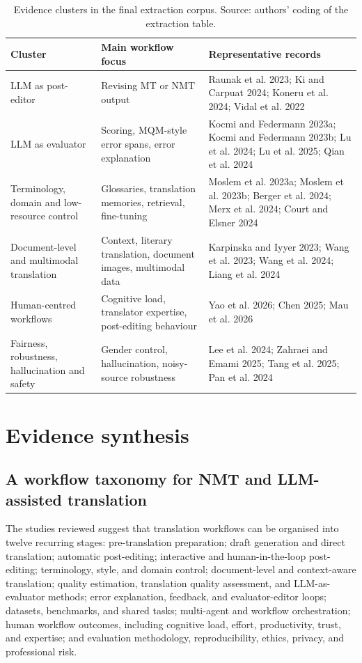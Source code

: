 \documentclass[11pt]{article}
\begin{document}
\begin{table}[t]
\centering
\caption{Evidence clusters in the final extraction corpus. Source: authors' coding of the extraction table.}
\small
\begin{tabularx}{\textwidth}{>{\RaggedRight\arraybackslash}p{2.8cm}>{\RaggedRight\arraybackslash}p{3.5cm}>{\RaggedRight\arraybackslash}X}
\toprule
Cluster & Main workflow focus & Representative records \\
\midrule
LLM as post-editor & Revising MT or NMT output & Raunak et al. 2023; Ki and Carpuat 2024; Koneru et al. 2024; Vidal et al. 2022 \\
LLM as evaluator & Scoring, MQM-style error spans, error explanation & Kocmi and Federmann 2023a; Kocmi and Federmann 2023b; Lu et al. 2024; Lu et al. 2025; Qian et al. 2024 \\
Terminology, domain and low-resource control & Glossaries, translation memories, retrieval, fine-tuning & Moslem et al. 2023a; Moslem et al. 2023b; Berger et al. 2024; Merx et al. 2024; Court and Elsner 2024 \\
Document-level and multimodal translation & Context, literary translation, document images, multimodal data & Karpinska and Iyyer 2023; Wang et al. 2023; Wang et al. 2024; Liang et al. 2024 \\
Human-centred workflows & Cognitive load, translator expertise, post-editing behaviour & Yao et al. 2026; Chen 2025; Mau et al. 2026 \\
Fairness, robustness, hallucination and safety & Gender control, hallucination, noisy-source robustness & Lee et al. 2024; Zahraei and Emami 2025; Tang et al. 2025; Pan et al. 2024 \\
\bottomrule
\end{tabularx}
\end{table}

\section{Evidence synthesis}
\subsection{A workflow taxonomy for NMT and LLM-assisted translation}
The studies reviewed suggest that translation workflows can be organised into twelve recurring stages: pre-translation preparation; draft generation and direct translation; automatic post-editing; interactive and human-in-the-loop post-editing; terminology, style, and domain control; document-level and context-aware translation; quality estimation, translation quality assessment, and LLM-as-evaluator methods; error explanation, feedback, and evaluator-editor loops; datasets, benchmarks, and shared tasks; multi-agent and workflow orchestration; human workflow outcomes, including cognitive load, effort, productivity, trust, and expertise; and evaluation methodology, reproducibility, ethics, privacy, and professional risk.
\end{document}
